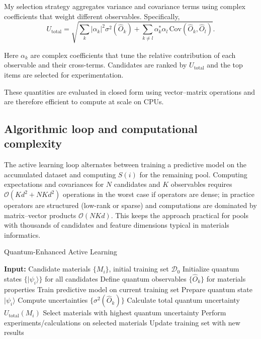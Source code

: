 \documentclass{article}
\begin{document}
My selection strategy aggregates variance and covariance terms using complex coefficients that weight different observables. Specifically,
\begin{equation}
U_{\text{total}} = \sqrt{\sum_k |\alpha_k|^2 \sigma^2(\hat{O}_k) + \sum_{k \neq l} \alpha_k^* \alpha_l \,\text{Cov}(\hat{O}_k,\hat{O}_l)}.
\end{equation}

Here $\alpha_k$ are complex coefficients that tune the relative contribution of each observable and their cross-terms. Candidates are ranked by $U_{\text{total}}$ and the top items are selected for experimentation.

These quantities are evaluated in closed form using vector–matrix operations and are therefore efficient to compute at scale on CPUs.

\subsection{Algorithmic loop and computational complexity}

The active learning loop alternates between training a predictive model on the accumulated dataset and computing $S(i)$ for the remaining pool. Computing expectations and covariances for $N$ candidates and $K$ observables requires $\mathcal{O}(K d^2 + N K d^2)$ operations in the worst case if operators are dense; in practice operators are structured (low-rank or sparse) and computations are dominated by matrix–vector products $\mathcal{O}(N K d)$. This keeps the approach practical for pools with thousands of candidates and feature dimensions typical in materials informatics.

\begin{algorithm}
\caption{Quantum-Enhanced Active Learning}
\begin{algorithmic}
\STATE \textbf{Input:} Candidate materials $\{M_i\}$, initial training set $\mathcal{D}_0$
\STATE Initialize quantum states $\{|\psi_i\rangle\}$ for all candidates
\STATE Define quantum observables $\{\hat{O}_k\}$ for materials properties
\REPEAT
\STATE Train predictive model on current training set
\STATE Prepare quantum state $|\psi_i\rangle$
\STATE Compute uncertainties $\{\sigma^2(\hat{O}_k)\}$
\STATE Calculate total quantum uncertainty $U_{\text{total}}(M_i)$
\ENDFOR
\STATE Select materials with highest quantum uncertainty
\STATE Perform experiments/calculations on selected materials
\STATE Update training set with new results
\end{algorithmic}
\end{algorithm}
\end{document}
